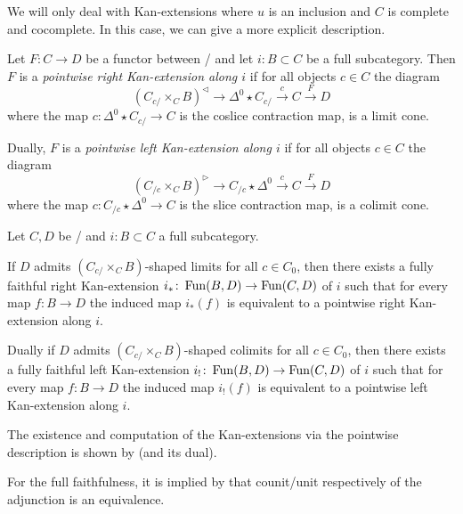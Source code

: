 We will only deal with Kan-extensions where $u$ is an inclusion and $C$ is complete and cocomplete.
In this case, we can give a more explicit description.
\begin{definition}\label{def:ptwiseKanExt} %
    Let $F\colon C\to D$ be a functor between \inftycats/ and let $i\colon B\subset C$ be a full subcategory.
    Then $F$ is a \emph{pointwise right Kan-extension along $i$} if for all objects $c\in C$ the diagram
    \begin{equation*}
        \left(C_{c/}\times_C B\right)^{\lhd}\to \Delta^0\star C_{c/}\xrightarrow{c} C\xrightarrow{F} D
    \end{equation*}
    where the map $c\colon\Delta^0\star C_{c/}\to C$ is the coslice contraction map, is a limit cone.

    Dually, $F$ is a \emph{pointwise left Kan-extension along $i$} if for all objects $c\in C$ the diagram
    \begin{equation*}
        \left(C_{/c}\times_C B\right)^{\rhd}\to C_{/c}\star\Delta^0 \xrightarrow{c} C\xrightarrow{F} D
    \end{equation*}
    where the map $c\colon C_{/c}\star\Delta^0\to C$ is the slice contraction map, is a colimit cone.
\end{definition}
\begin{prop}\label{prop:exKanExt}
    Let $C,D$ be \inftycats/ and $i\colon B\subset C$ a full subcategory.
    
    If $D$ admits $\left(C_{c/}\times_C B\right)$-shaped limits for all $c\in C_0$, then there exists a fully faithful right Kan-extension $i_*\colon\operatorname{Fun}(B,D)\to\operatorname{Fun}(C,D)$ of $i$ such that for every map $f\colon B\to D$ the induced map $i_*(f)$ is equivalent to a pointwise right Kan-extension along $i$.

    Dually if $D$ admits $\left(C_{c/}\times_C B\right)$-shaped colimits for all $c\in C_0$, then there exists a fully faithful left Kan-extension $i_!\colon\operatorname{Fun}(B,D)\to\operatorname{Fun}(C,D)$ of $i$ such that for every map $f\colon B\to D$ the induced map $i_!(f)$ is equivalent to a pointwise left Kan-extension along $i$.
    \begin{reference}
        The existence and computation of the Kan-extensions via the pointwise description is shown by \cite[Proposition 6.4.9]{cisinski_2019} (and its dual).
        
        For the full faithfulness, it is implied by \cite[Corollary 7.3.1.16]{kerodon} that counit/unit respectively of the adjunction is an equivalence.
    \end{reference}
\end{prop}